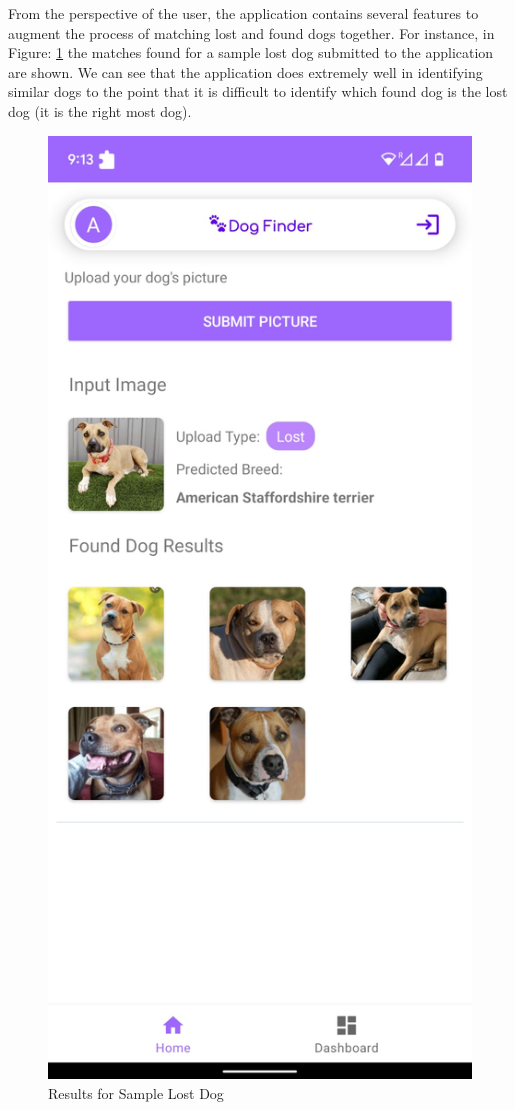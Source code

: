 \documentclass{article}
\begin{document}
From the perspective of the user, the application contains several features to augment the process of matching lost and found dogs together.  For instance, in Figure: \ref{fig:x Android app 1} the matches found for a sample lost dog submitted to the application are shown.  We can see that the application does extremely well in identifying similar dogs to the point that it is difficult to identify which found dog is the lost dog (it is the right most dog).

\begin{figure}[h]
\centering
	\includegraphics[scale=0.1]{final-report-images/app-search-results.jpeg}
\caption{Results for Sample Lost Dog}
\label{fig:x Android app 1}
\end{figure}
\end{document}
